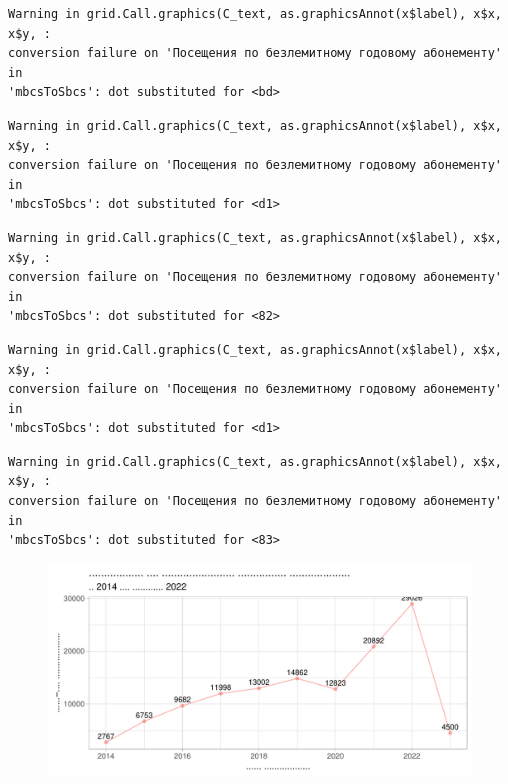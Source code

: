 \documentclass[
  letterpaper,
  DIV=11,
  numbers=noendperiod]{scrartcl}
\begin{document}
\begin{verbatim}
Warning in grid.Call.graphics(C_text, as.graphicsAnnot(x$label), x$x, x$y, :
conversion failure on 'Посещения по безлемитному годовому абонементу' in
'mbcsToSbcs': dot substituted for <bd>
\end{verbatim}

\begin{verbatim}
Warning in grid.Call.graphics(C_text, as.graphicsAnnot(x$label), x$x, x$y, :
conversion failure on 'Посещения по безлемитному годовому абонементу' in
'mbcsToSbcs': dot substituted for <d1>
\end{verbatim}

\begin{verbatim}
Warning in grid.Call.graphics(C_text, as.graphicsAnnot(x$label), x$x, x$y, :
conversion failure on 'Посещения по безлемитному годовому абонементу' in
'mbcsToSbcs': dot substituted for <82>
\end{verbatim}

\begin{verbatim}
Warning in grid.Call.graphics(C_text, as.graphicsAnnot(x$label), x$x, x$y, :
conversion failure on 'Посещения по безлемитному годовому абонементу' in
'mbcsToSbcs': dot substituted for <d1>
\end{verbatim}

\begin{verbatim}
Warning in grid.Call.graphics(C_text, as.graphicsAnnot(x$label), x$x, x$y, :
conversion failure on 'Посещения по безлемитному годовому абонементу' in
'mbcsToSbcs': dot substituted for <83>
\end{verbatim}

\begin{figure}

{\centering \includegraphics{./intro_files/figure-pdf/unnamed-chunk-9-1.pdf}

}

\end{figure}
\end{document}
